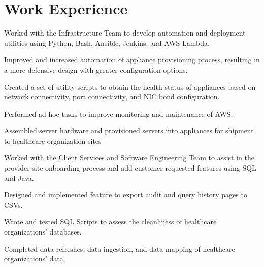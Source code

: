 \documentclass[letterpaper]{deedy-resume} %
\begin{document}
%
\begin{minipage}[t]{0.65\textwidth} %


\section{Work Experience}

\vspace{\topsep} %
\begin{tightitemize}
\item Worked with the Infrastructure Team to develop automation and deployment utilities using Python, Bash, Ansible, Jenkins, and AWS Lambda.
\item Improved and increased automation of appliance provisioning process, resulting in a more defensive design with greater configuration options.
\item Created a set of utility scripts to obtain the health status of appliances based on network connectivity, port connectivity, and NIC bond configuration.
\item Performed ad-hoc tasks to improve monitoring and maintenance of AWS.
\item Assembled server hardware and provisioned servers into appliances for shipment to healthcare organization sites
\end{tightitemize}
\sectionspace %

\begin{tightitemize}
\item Worked with the Client Services and Software Engineering Team to assist in the provider site onboarding process and add customer-requested features using SQL and Java.
\item Designed and implemented feature to export audit and query history pages to CSVs. 
\item Wrote and tested SQL Scripts to assess the cleanliness of healthcare organizations’ databases.
\item Completed data refreshes, data ingestion, and data mapping of healthcare organizations' data.
\end{tightitemize}


\end{minipage}
\end{document}
